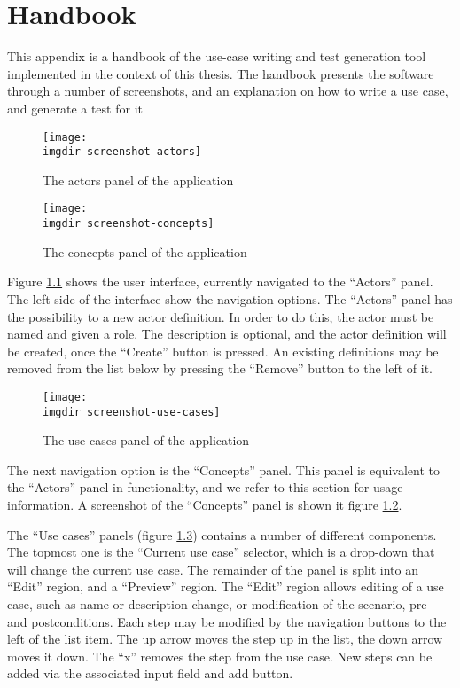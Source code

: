 \chapter{Handbook}
\label{appendix:handbook}
This appendix is a handbook of the use-case writing and test generation tool implemented in the context of this thesis. The handbook presents the software through a number of screenshots, and an explanation on how to write a use case, and generate a test for it\medskip

\begin{figure}[!htbp]
  \centering
  \texttt{[image: \\imgdir screenshot-actors]}
  \caption{The actors panel of the application}
\label{fig:screenshot-actors}
\end{figure}
\begin{figure}[!htbp]
  \centering
  \texttt{[image: \\imgdir screenshot-concepts]}
  \caption{The concepts panel of the application}
\label{fig:screenshot-concepts}
\end{figure}

\noindent Figure \ref{fig:screenshot-actors} shows the user interface, currently navigated to the ``Actors'' panel. The left side of the interface show the navigation options. The ``Actors'' panel has the possibility to a new actor definition. In order to do this, the actor must be named and given a role. The description is optional, and the actor definition will be created, once the ``Create'' button is pressed. An existing definitions may be removed from the list below by pressing the ``Remove'' button to the left of it. \medskip

\begin{figure}[!htbp]
  \centering
  \texttt{[image: \\imgdir screenshot-use-cases]}
  \caption{The use cases panel of the application}
\label{fig:screenshot-use-cases}
\end{figure}

\noindent The next navigation option is the ``Concepts'' panel. This panel is equivalent to the ``Actors'' panel in functionality, and we refer to this section for usage information. A screenshot of the ``Concepts'' panel is shown it figure \ref{fig:screenshot-concepts}.\medskip

\noindent The ``Use cases'' panels (figure \ref{fig:screenshot-use-cases}) contains a number of different components. The topmost one is the ``Current use case'' selector, which is a drop-down that will change the current use case. The remainder of the panel is split into an ``Edit'' region, and a ``Preview'' region. The ``Edit'' region allows editing of a use case, such as name or description change, or modification of the scenario, pre- and postconditions. Each step may be modified by the navigation buttons to the left of the list item. The up arrow moves the step up in the list, the down arrow moves it down. The ``x'' removes the step from the use case. New steps can be added via the associated input field and add button.\medskip


